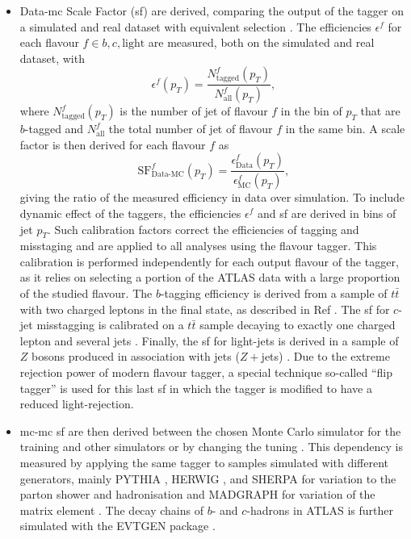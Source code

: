 \begin{itemize}
  \item Data-\gls{mc} Scale Factor (\gls{sf}) are derived, comparing the output of the tagger on a simulated and real dataset with equivalent selection \cite{Aad:2019aic, ATLAS-CONF-2018-045, ATLAS-CONF-2018-006, cjettaggingCalib}. The efficiencies $\epsilon^f$ for each flavour $f \in {b, c, \textrm{light}}$ are measured, both on the simulated and real dataset, with \[\epsilon^f(p_T) = \frac{N^f_{\textrm{tagged}}(p_T)}{N^f_{\textrm{all}}(p_T)},\] where $N^f_{\textrm{tagged}}(p_T)$ is the number of jet of flavour $f$ in the bin of $p_T$ that are $b$-tagged and $N^f_{\textrm{all}}$ the total number of jet of flavour $f$ in the same bin. A scale factor is then derived for each flavour $f$ as \[\textrm{SF}^f_{\textrm{Data-MC}}(p_T) = \frac{\epsilon^f_{\textrm{Data}}(p_T)}{\epsilon^f_{\textrm{MC}}(p_T)},\] giving the ratio of the measured efficiency in data over simulation. To include dynamic effect of the taggers, the efficiencies $\epsilon^f$ and \gls{sf} are derived in bins of jet $p_T$. Such calibration factors correct the efficiencies of tagging and misstaging and are applied to all analyses using the flavour tagger. This calibration is performed independently for each output flavour of the tagger, as it relies on selecting a portion of the ATLAS data with a large proportion of the studied flavour. The $b$-tagging efficiency is derived from a sample of $t\bar{t}$ with two charged leptons in the final state, as described in Ref \cite{Aad:2019aic}. The \gls{sf} for $c$-jet misstagging is calibrated on a $t\bar{t}$ sample decaying to exactly one charged lepton and several jets \cite{cjettaggingCalib}. Finally, the \gls{sf} for light-jets is derived in a sample of $Z$ bosons produced in association with jets ($Z+$jets) \cite{ATLAS:2023lwk}. Due to the extreme rejection power of modern flavour tagger, a special technique so-called ``flip tagger'' is used for this last \gls{sf} in which the tagger is modified to have a reduced light-rejection.
  \item \gls{mc}-\gls{mc} \gls{sf} are then derived between the chosen Monte Carlo simulator for the training and other simulators or by changing the tuning \cite{ATL-PHYS-PUB-2020-009}. This dependency is measured by applying the same tagger to samples simulated with different generators, mainly \uppercase{Pythia} \cite{SJOSTRAND2015159}, \uppercase{Herwig} \cite{bellm2017herwig}, and \uppercase{Sherpa} \cite{sherpa2.2paper} for variation to the parton shower and hadronisation and \uppercase{MadGraph} for variation of the matrix element \cite{madgraph}. The decay chains of $b$- and $c$-hadrons in ATLAS is further simulated with the \uppercase{EvtGen} package \cite{LANGE2001152}. 

\end{itemize}
